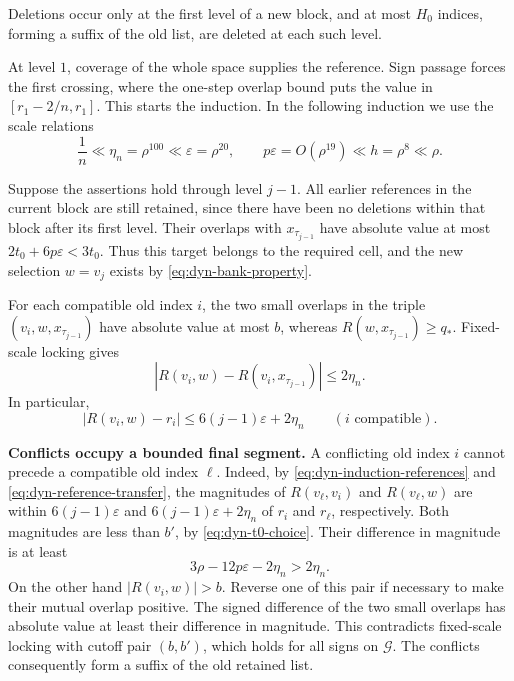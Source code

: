 Deletions occur only at the first level of a new block, and at most $H_0$
indices, forming a suffix of the old list, are deleted at each such level.

At level $1$, coverage of the whole space supplies the reference.
Sign passage forces the first crossing, where the one-step overlap
bound puts the value in $[r_1-2/n,r_1]$. This starts the induction. In the following induction we
use the scale relations
\begin{equation}\label{eq:dyn-scale-relations}
 \frac1n\ll\eta_n=\rho^{100}\ll\varepsilon=\rho^{20},\qquad
 p\varepsilon=O(\rho^{19})\ll h=\rho^8\ll\rho.
\end{equation}

Suppose the assertions hold through level $j-1$. All earlier references
in the current block are still retained, since there have been no
deletions within that block after its first level. Their overlaps with
$x_{\tau_{j-1}}$ have absolute value at most
$2t_0+6p\varepsilon<3t_0$. Thus this target belongs to the required cell,
and the new selection $w=v_j$ exists by
\eqref{eq:dyn-bank-property}.

For each compatible old index $i$, the two small overlaps in the triple
$(v_i,w,x_{\tau_{j-1}})$ have absolute value at most $b$, whereas
$R(w,x_{\tau_{j-1}})\geq q_*$. Fixed-scale locking gives
\begin{equation}\label{eq:dyn-target-transfer}
 |R(v_i,w)-R(v_i,x_{\tau_{j-1}})|\leq2\eta_n.
\end{equation}
In particular,
\begin{equation}\label{eq:dyn-reference-transfer}
 |R(v_i,w)-r_i|\leq6(j-1)\varepsilon+2\eta_n
 \qquad(i\text{ compatible}).
\end{equation}

\par\medskip\noindent\textbf{Conflicts occupy a bounded final segment.}\enspace
A conflicting old index $i$ cannot precede a compatible old index $\ell$. Indeed, by
\eqref{eq:dyn-induction-references} and
\eqref{eq:dyn-reference-transfer}, the magnitudes of
$R(v_\ell,v_i)$ and $R(v_\ell,w)$ are within
$6(j-1)\varepsilon$ and $6(j-1)\varepsilon+2\eta_n$ of $r_i$ and
$r_\ell$, respectively.
Both magnitudes are less than $b'$, by
\eqref{eq:dyn-t0-choice}. Their difference in magnitude is at least
\[
 3\rho-12p\varepsilon-2\eta_n>2\eta_n.
\]
On the other hand $|R(v_i,w)|>b$. Reverse one of this pair if necessary
to make their mutual overlap positive. The signed difference of the two
small overlaps has absolute value at least their difference in magnitude.
This contradicts fixed-scale locking with cutoff pair $(b,b')$, which
holds for all signs on $\mathcal G$. The conflicts consequently form a
suffix of the old retained list.

